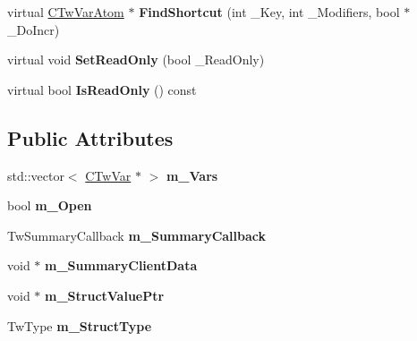 \begin{DoxyCompactItemize}
\item 
\hypertarget{struct_c_tw_var_group_a767d27166e6b3f5cb1624cff13802a85}{virtual \hyperlink{struct_c_tw_var_atom}{C\+Tw\+Var\+Atom} $\ast$ {\bfseries Find\+Shortcut} (int \+\_\+\+Key, int \+\_\+\+Modifiers, bool $\ast$\+\_\+\+Do\+Incr)}\label{struct_c_tw_var_group_a767d27166e6b3f5cb1624cff13802a85}

\item 
\hypertarget{struct_c_tw_var_group_aba76ea2be965a6c961e59de8fc33d36a}{virtual void {\bfseries Set\+Read\+Only} (bool \+\_\+\+Read\+Only)}\label{struct_c_tw_var_group_aba76ea2be965a6c961e59de8fc33d36a}

\item 
\hypertarget{struct_c_tw_var_group_ae96265a3e0f463cd200ea96804a0ace5}{virtual bool {\bfseries Is\+Read\+Only} () const }\label{struct_c_tw_var_group_ae96265a3e0f463cd200ea96804a0ace5}

\end{DoxyCompactItemize}
\subsection*{Public Attributes}
\begin{DoxyCompactItemize}
\item 
\hypertarget{struct_c_tw_var_group_a7910ecd8d2ec950f25cb3135f2e2f09e}{std\+::vector$<$ \hyperlink{struct_c_tw_var}{C\+Tw\+Var} $\ast$ $>$ {\bfseries m\+\_\+\+Vars}}\label{struct_c_tw_var_group_a7910ecd8d2ec950f25cb3135f2e2f09e}

\item 
\hypertarget{struct_c_tw_var_group_a15fcd1028cd63f3eecdc546ba0827dbf}{bool {\bfseries m\+\_\+\+Open}}\label{struct_c_tw_var_group_a15fcd1028cd63f3eecdc546ba0827dbf}

\item 
\hypertarget{struct_c_tw_var_group_a12e5724d55c5069272a31cbe9d8b0adf}{Tw\+Summary\+Callback {\bfseries m\+\_\+\+Summary\+Callback}}\label{struct_c_tw_var_group_a12e5724d55c5069272a31cbe9d8b0adf}

\item 
\hypertarget{struct_c_tw_var_group_a989efc1cae1bddf88359ac18bcff9cfd}{void $\ast$ {\bfseries m\+\_\+\+Summary\+Client\+Data}}\label{struct_c_tw_var_group_a989efc1cae1bddf88359ac18bcff9cfd}

\item 
\hypertarget{struct_c_tw_var_group_a316b1d9249d3a8377ba050871ee23377}{void $\ast$ {\bfseries m\+\_\+\+Struct\+Value\+Ptr}}\label{struct_c_tw_var_group_a316b1d9249d3a8377ba050871ee23377}

\item 
\hypertarget{struct_c_tw_var_group_a844452441d1e9c73132a7027ed53628e}{Tw\+Type {\bfseries m\+\_\+\+Struct\+Type}}\label{struct_c_tw_var_group_a844452441d1e9c73132a7027ed53628e}

\end{DoxyCompactItemize}
